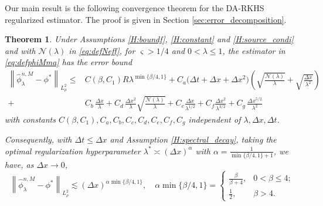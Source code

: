 \documentclass[12pt]{article}
\newtheorem{theorem}{Theorem}
\numberwithin{equation}{section}
\numberwithin{theorem}{section}
\begin{document}
Our main result is the following convergence theorem for the DA-RKHS regularized estimator. The proof is given in Section \ref{sec:error_decomposition}.   
\begin{theorem}\label{thm:conv}
Under Assumptions \ref{H:boundf}, \ref{H:constant} and \ref{H:source_condi} and with $\mathcal{N}(\lambda)$ in \eqref{eq:defNeff}, for $\varsigma > 1/4$ and $0<\lambda \leq 1$,
the estimator in \eqref{eq:defphiMma} has the error bound
$$
\begin{aligned}
\left\|\hat{\phi}_\lambda^{n, M}-\phi^*\right\|_{L_\rho^2} 
\leq & C\left(\beta, C_1\right) R \lambda^{\min \{\beta / 4,1\}} + C_{a}\bigl(\Delta t+\Delta x+\Delta x^2\bigr) \left( \sqrt{\frac{\mathcal{N}(\lambda)}{\lambda}} + \sqrt{\frac{\Delta x}{\lambda^2}}\right) \\
 + & C_{b}\,\frac{\Delta x}{\lambda}
+ C_{d}\,\frac{\Delta x^2}{\lambda}\sqrt{\frac{\mathcal{N}(\lambda)}{\lambda}}
+ C_e \frac{\Delta x}{{\lambda}^{1/2}} +C_f \frac{\Delta x ^2}{\lambda^{3/2}}+ C_{g}\,\frac{\Delta x^{5/2}}{\lambda^2}
\end{aligned}
$$
with constants $ C\left(\beta, C_1\right), C_{a}, C_{b}, C_{c}, C_{d}, C_{e},C_{f},C_g$ independent of $\lambda, \Delta x, \Delta t$. 

Consequently, with $\Delta t \leq \Delta x$ and Assumption \ref{H:spectral_decay}, taking the optimal regularization  hyperparameter $\lambda ^* \asymp(\Delta x)^\alpha$ with $\alpha=\frac{1}{\min \{\beta / 4,1\}+1}$, 
we have, as $\Delta x\to 0$,  
$$
\left\|\hat{\phi}_\lambda^{n, M}-\phi^*\right\|_{L^2_{\rho}} \lesssim(\Delta x)^{\alpha \min \{\beta / 4,1\}}, \quad  \alpha \min \{\beta / 4,1\}= \begin{cases}\frac{\beta}{ \beta +4}, & 0<\beta \leq 4;  \\ \frac{1}{2}, & \beta>4. \end{cases}
$$ 
\end{theorem}
\end{document}
